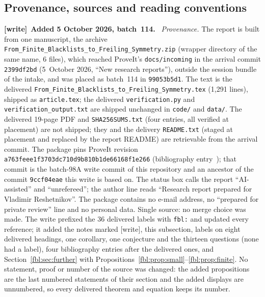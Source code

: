 \documentclass[11pt]{article}
\theoremstyle{definition}
\theoremstyle{remark}
\newcommand{\file}[1]{\nolinkurl{#1}}
\newenvironment{writenote}[1][]{\par\smallskip\begingroup\small
 \noindent\textbf{[write]}\if\relax\detokenize{#1}\relax\else~\textbf{#1.}\fi\ }%
 {\par\endgroup\smallskip}
\begin{document}
\subsection{Provenance, sources and reading conventions}
\label{fbl:sec:provenance}
\begin{writenote}[Added 5 October 2026, batch~114]
\emph{Provenance.} The report is built from one manuscript, the archive
\file{From_Finite_Blacklists_to_Freiling_Symmetry.zip} (wrapper directory of
the same name, 6 files), which reached ProveIt's \file{docs/incoming} in the
arrival commit \file{2399df2bd} (5~October 2026, ``New research reports''),
outside the session bundle of the intake, and was placed as batch~114 in
\file{99053b5d1}. The text is the delivered
\file{From_Finite_Blacklists_to_Freiling_Symmetry.tex} (1{,}291 lines),
shipped as \file{article.tex}; the delivered \file{verification.py} and
\file{verification_output.txt} are shipped unchanged in \file{code/} and
\file{data/}. The delivered 19-page PDF and \file{SHA256SUMS.txt} (four
entries, all verified at placement) are not shipped; they and the delivery
\file{README.txt} (staged at placement and replaced by the report README)
are retrievable from the arrival commit. The package pins ProveIt revision
\file{a763feee1f3703dc710d9b810b1de66168f1e266} (bibliography
entry~\cite{ProveIt}); that commit is the batch-98A write commit of this
repository and an ancestor of the commit \file{9ccf04eae} this write is
based on. The status box calls the report ``AI-assisted'' and
``unrefereed''; the author line reads ``Research report prepared for
Vladimir Reshetnikov''. The package contains no e-mail address, no
``prepared for private review'' line and no personal data. Single source:
no merge choice was made. The write prefixed the 36 delivered labels with
\file{fbl:} and updated every reference; it added the notes marked [write],
this subsection, labels on eight delivered headings, one corollary, one
conjecture and the thirteen questions (none had a label), four
bibliography entries after the delivered ones, and
Section~\ref{fbl:sec:further} with
Propositions~\ref{fbl:prop:small}--\ref{fbl:prop:finite}. No statement,
proof or number of the source was changed: the added propositions are the
last numbered statements of their section and the added displays are
unnumbered, so every delivered theorem and equation keeps its number.


\end{writenote}
\end{document}
